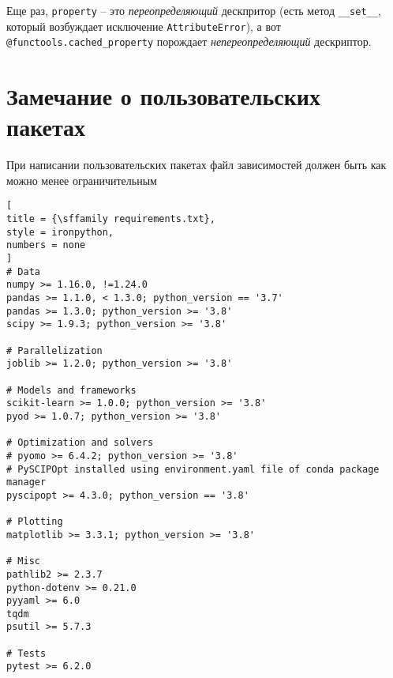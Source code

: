 \documentclass[%
	11pt,
	a4paper,
	utf8,
		]{article}
\begin{document}
Еще раз, \verb*|property| -- это \emph{переопределяющий} дескпритор (есть метод \verb|__set__|, который возбуждает исключение \verb*|AttributeError|), а вот \verb|@functools.cached_property| порождает \emph{непереопределяющий} дескриптор.









\section{Замечание о пользовательских пакетах}

При написании пользовательских пакетах файл зависимостей должен быть как можно менее ограничительным
\begin{lstlisting}[
title = {\sffamily requirements.txt},
style = ironpython,
numbers = none
]
# Data
numpy >= 1.16.0, !=1.24.0
pandas >= 1.1.0, < 1.3.0; python_version == '3.7'
pandas >= 1.3.0; python_version >= '3.8'
scipy >= 1.9.3; python_version >= '3.8'

# Parallelization
joblib >= 1.2.0; python_version >= '3.8'

# Models and frameworks
scikit-learn >= 1.0.0; python_version >= '3.8'
pyod >= 1.0.7; python_version >= '3.8'

# Optimization and solvers
# pyomo >= 6.4.2; python_version >= '3.8'
# PySCIPOpt installed using environment.yaml file of conda package manager
pyscipopt >= 4.3.0; python_version == '3.8'

# Plotting
matplotlib >= 3.3.1; python_version >= '3.8'

# Misc
pathlib2 >= 2.3.7
python-dotenv >= 0.21.0
pyyaml >= 6.0
tqdm
psutil >= 5.7.3

# Tests
pytest >= 6.2.0
\end{lstlisting}
\end{document}
